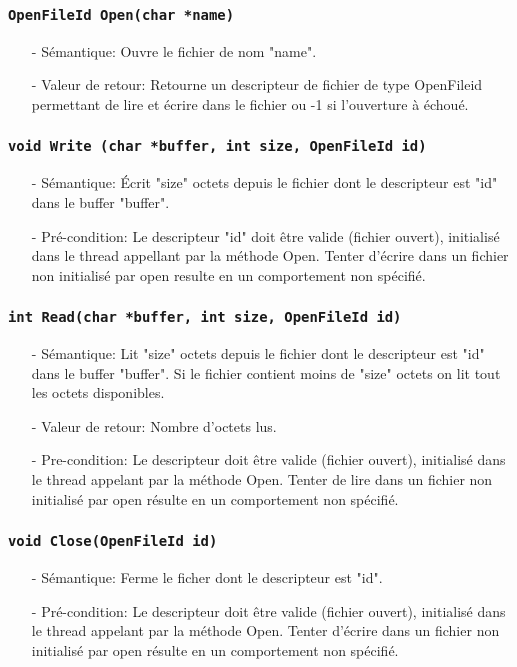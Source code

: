 \documentclass[11pt]{article}
\begin{document}
\subsubsection{\texttt{OpenFileId Open(char *name)}}
\begin{itemize}
\item[-]Sémantique: Ouvre le fichier de nom "name". 
\item[-]Valeur de retour: Retourne un descripteur de fichier de type OpenFileid
  permettant de lire et écrire dans le fichier ou -1 si l'ouverture à échoué.
\end{itemize}

\subsubsection{\texttt{void Write (char *buffer, int size, OpenFileId id)}}
\begin{itemize}
\item[-]Sémantique: Écrit "size" octets depuis le fichier dont le descripteur est "id"
  dans le buffer "buffer".
\item[-]Pré-condition: Le descripteur "id" doit être valide (fichier ouvert), initialisé dans le thread appellant
  par la méthode Open. Tenter d'écrire dans un fichier non initialisé par open resulte en un comportement non spécifié.
\end{itemize}

\subsubsection{\texttt{int Read(char *buffer, int size, OpenFileId id)}}
\begin{itemize}
\item[-]Sémantique: Lit "size" octets depuis le fichier dont le descripteur est "id" dans le buffer
  "buffer". Si le fichier contient moins de "size" octets on lit tout les octets disponibles.
\item[-]Valeur de retour: Nombre d'octets lus.
\item[-]Pre-condition: Le descripteur doit être valide (fichier ouvert), initialisé dans le thread appelant
  par la méthode Open.
  Tenter de lire dans un fichier non initialisé par open résulte en un comportement non spécifié.
\end{itemize}

\subsubsection{\texttt{void Close(OpenFileId id)}}
\begin{itemize}
\item[-]Sémantique: Ferme le ficher dont le descripteur est "id".
\item[-]Pré-condition: Le descripteur doit être valide (fichier ouvert), initialisé dans le thread appelant
  par la méthode Open. Tenter d'écrire dans un fichier non initialisé par open résulte en un comportement non spécifié.
\end{itemize}
\end{document}
